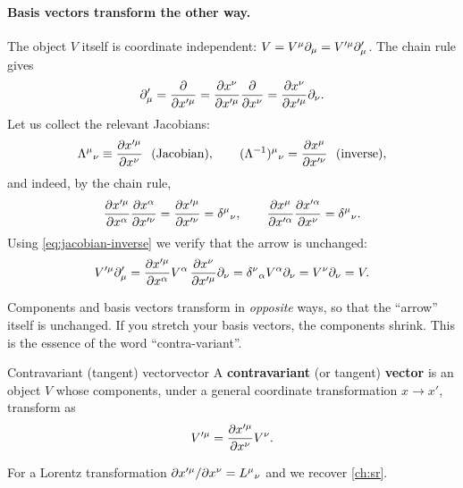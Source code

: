 \paragraph{Basis vectors transform the other way.} The object $V$ itself is coordinate independent: $V=V^\mu\partial_\mu=V'^\mu\partial'_\mu$. The chain rule gives
\begin{equation}
  \partial'_\mu=\frac{\partial}{\partial x'^\mu}=\frac{\partial x^\nu}{\partial x'^\mu}\frac{\partial}{\partial x^\nu}=\frac{\partial x^\nu}{\partial x'^\mu}\partial_\nu .
\end{equation}
Let us collect the relevant Jacobians:
\begin{equation}
  \Lambda^\mu{}_\nu\equiv\frac{\pd x'^\mu}{\pd x^\nu}\ \ \text{(Jacobian)},\qquad
  (\Lambda^{-1})^\mu{}_\nu=\frac{\pd x^\mu}{\pd x'^\nu}\ \ \text{(inverse)},
\end{equation}
and indeed, by the chain rule,
\begin{equation}
  \frac{\partial x'^\mu}{\partial x^\alpha}\frac{\partial x^\alpha}{\partial x'^\nu}=\frac{\partial x'^\mu}{\partial x'^\nu}=\delta^\mu{}_\nu,\qquad
  \frac{\partial x^\mu}{\partial x'^\alpha}\frac{\partial x'^\alpha}{\partial x^\nu}=\delta^\mu{}_\nu .
  \label{eq:jacobian-inverse}
\end{equation}
Using \eqref{eq:jacobian-inverse} we verify that the arrow is unchanged:
\begin{equation}
  V'^\mu\partial'_\mu=\frac{\partial x'^\mu}{\partial x^\alpha}V^\alpha\,\frac{\partial x^\nu}{\partial x'^\mu}\partial_\nu=\delta^\nu{}_\alpha V^\alpha\partial_\nu=V^\nu\partial_\nu=V .
\end{equation}

\begin{remarkbox}
Components and basis vectors transform in \emph{opposite} ways, so that the ``arrow'' itself is unchanged. If you stretch your basis vectors, the components shrink. This is the essence of the word ``contra-variant''.
\end{remarkbox}

\begin{definition}{Contravariant (tangent) vector}{vector}
A \textbf{contravariant} (or tangent) \textbf{vector} is an object $V$ whose components, under a general coordinate transformation $x\to x'$, transform as
\begin{equation}
  V'^\mu=\frac{\partial x'^\mu}{\partial x^\nu}V^\nu .
\end{equation}
\end{definition}
For a Lorentz transformation $\partial x'^\mu/\partial x^\nu=L^\mu{}_\nu$ and we recover \cref{ch:sr}.

